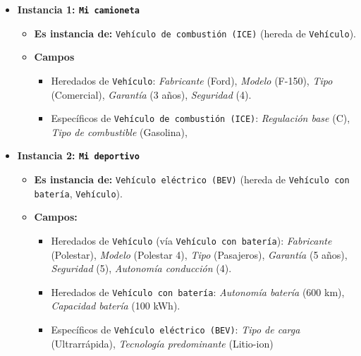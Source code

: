 \documentclass[11pt, a4paper]{article}
\newenvironment{problem}[1][Cuestión]{
	\vspace{0.5cm}
	\noindent{\Large\bfseries #1} \par\vspace{0.5cm}
}{
	\vspace{0.5cm}
}
\begin{document}
\begin{problem}[Problema 1 (40 \%)]
\begin{enumerate}[label=\alph*)]
{				\begin{itemize}
					\item \textbf{Instancia 1: \texttt{Mi camioneta}}
						\begin{itemize}
							\item \textbf{Es instancia de:} \texttt{Vehículo de combustión (ICE)} (hereda de \texttt{Vehículo}).
							\item \textbf{Campos}
								\begin{itemize}
									\item Heredados de \texttt{Vehículo}: 
										\textit{Fabricante} (Ford), \textit{Modelo} (F-150), \textit{Tipo} (Comercial), \textit{Garantía} (3 años), \textit{Seguridad} (4).
									\item Específicos de \texttt{Vehículo de combustión (ICE)}: 
										\textit{Regulación base} (C),
										\textit{Tipo de combustible } (Gasolina),
								\end{itemize}
						\end{itemize}

					\vspace{0.5cm}

					\item \textbf{Instancia 2: \texttt{Mi deportivo}}
						\begin{itemize}
							\item \textbf{Es instancia de:} \texttt{Vehículo eléctrico (BEV)} (hereda de \texttt{Vehículo con batería}, \texttt{Vehículo}).
							\item \textbf{Campos:}
								\begin{itemize}
									\item Heredados de \texttt{Vehículo} (vía \texttt{Vehículo con batería}): \textit{Fabricante} (Polestar), \textit{Modelo} (Polestar 4), \textit{Tipo} (Pasajeros), \textit{Garantía} (5 años), \textit{Seguridad} (5), \textit{Autonomía conducción} (4).
									\item Heredados de \texttt{Vehículo con batería}: \textit{Autonomía batería} (600 km), \textit{Capacidad batería} (100 kWh).
									\item Específicos de \texttt{Vehículo eléctrico (BEV)}: \textit{Tipo de carga} (Ultrarrápida), \textit{Tecnología predominante} (Litio-ion)
								\end{itemize}
						\end{itemize}
				\end{itemize}
			}
		\end{enumerate}
	\end{problem}
\end{document}
